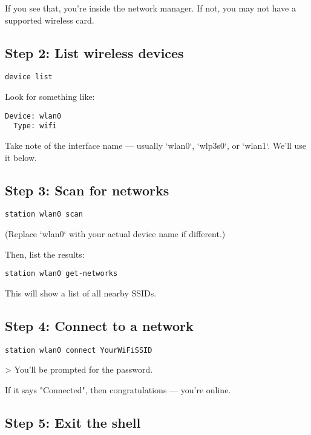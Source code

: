 \documentclass[12pt]{book}
\begin{document}
If you see that, you're inside the network manager. If not, you may not have a supported wireless card.

\subsection*{Step 2: List wireless devices}

\begin{lstlisting}
device list
\end{lstlisting}

Look for something like:

\begin{lstlisting}
Device: wlan0
  Type: wifi
\end{lstlisting}

Take note of the interface name — usually `wlan0`, `wlp3s0`, or `wlan1`. We’ll use it below.

\subsection*{Step 3: Scan for networks}

\begin{lstlisting}
station wlan0 scan
\end{lstlisting}

(Replace `wlan0` with your actual device name if different.)

Then, list the results:

\begin{lstlisting}
station wlan0 get-networks
\end{lstlisting}

This will show a list of all nearby SSIDs.

\subsection*{Step 4: Connect to a network}

\begin{lstlisting}
station wlan0 connect YourWiFiSSID
\end{lstlisting}

> You’ll be prompted for the password.

If it says "Connected", then congratulations — you’re online.

\subsection*{Step 5: Exit the shell}
\end{document}

